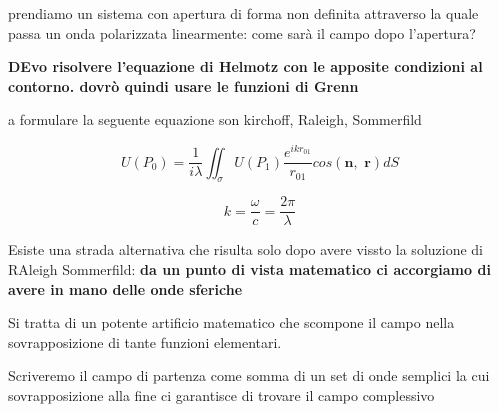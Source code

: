 \documentclass{article}
\begin{document}
prendiamo un sistema con apertura di forma non definita attraverso la quale passa un onda polarizzata linearmente: come sarà il campo dopo l'apertura?

\textbf{DEvo risolvere l'equazione di Helmotz con le apposite condizioni al contorno. dovrò quindi usare le funzioni di Grenn} 



a formulare la seguente equazione son kirchoff, Raleigh, Sommerfild

\begin{equation}
U(P_{0}) = \frac{1}{i\lambda} \iint_\sigma U(P_{1}) \frac{e^{i k r_{01}}}{r_{01}} cos(\textbf{n} , \textbf{ r})dS
\end{equation}

\begin{equation}
k=\frac{\omega}{c}  = \frac{2\pi}{\lambda}
\end{equation}

Esiste una strada alternativa che risulta solo dopo avere vissto la soluzione di RAleigh Sommerfild: \textbf{da un punto di vista matematico ci accorgiamo di avere in mano delle onde sferiche}

Si tratta di un potente artificio matematico che scompone il campo nella sovrapposizione di tante funzioni elementari.

Scriveremo il campo di partenza come somma di un set di onde semplici la cui sovrapposizione alla fine ci garantisce di trovare il campo complessivo

 
\end{document}
